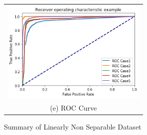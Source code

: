 \begin{figure}[H]
\begin{tabular}{cc}
		
		
		\multicolumn{2}{c}{\includegraphics[width=70mm]{./dataset2/roc.png} }\\
		\multicolumn{2}{c}{(e) ROC Curve}
		
	\end{tabular}\hspace*{-1cm}
	\caption{Summary of Linearly Non Separable Dataset}
\end{figure}